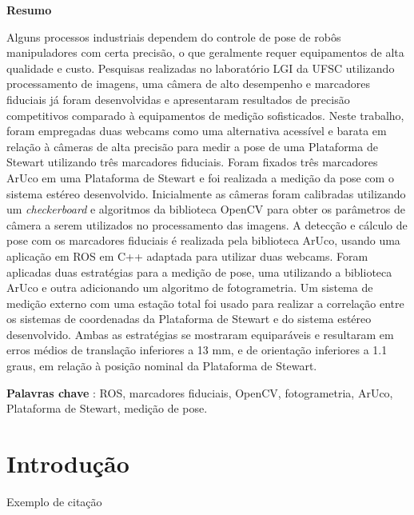 \documentclass[12pt,a4paper,oneside,english, brazil]{abntex2}
\begin{document}



\textbf{Resumo}

Alguns processos industriais dependem do controle de pose de robôs manipuladores com certa precisão, o que geralmente requer equipamentos de alta qualidade e custo. Pesquisas realizadas no laboratório LGI da UFSC utilizando processamento de imagens, uma câmera de alto desempenho e marcadores fiduciais já foram desenvolvidas e apresentaram resultados de precisão competitivos comparado à equipamentos de medição sofisticados. Neste trabalho, foram empregadas duas webcams como uma alternativa acessível e barata em relação à câmeras de alta precisão para medir a pose de uma Plataforma de Stewart utilizando três marcadores fiduciais. Foram fixados três marcadores ArUco em uma Plataforma de Stewart e foi realizada a medição da pose com o sistema estéreo desenvolvido. Inicialmente as câmeras foram calibradas utilizando um \textit{checkerboard} e algoritmos da biblioteca OpenCV para obter os parâmetros de câmera a serem utilizados no processamento das imagens. A detecção e cálculo de pose com os marcadores fiduciais é realizada pela biblioteca ArUco, usando uma aplicação em ROS em C++ adaptada para utilizar duas webcams. Foram aplicadas duas estratégias para a medição de pose, uma utilizando a biblioteca ArUco e outra adicionando um algoritmo de fotogrametria. Um sistema de medição externo com uma estação total foi usado para realizar a correlação entre os sistemas de coordenadas da Plataforma de Stewart e do sistema estéreo desenvolvido. Ambas as estratégias se mostraram equiparáveis e resultaram em erros médios de translação inferiores a 13 mm, e de orientação inferiores a 1.1 graus, em relação à posição nominal da Plataforma de Stewart.

 \textbf{Palavras chave} : ROS, marcadores fiduciais, OpenCV, fotogrametria, ArUco,  Plataforma de Stewart, medição de pose.




\chapter{Introdução}




Exemplo de citação \cite{gallimore2018robot} \cite{gallimore2018robot}

%

\end{document}
